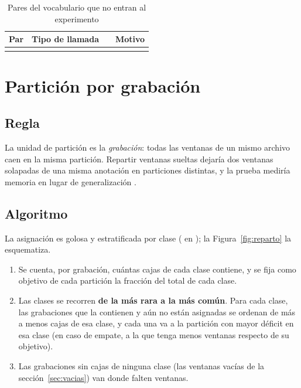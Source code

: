 \documentclass[12pt,a4paper]{article}
\begin{document}
\begin{table}[htbp]
    \centering
    \caption{Pares del vocabulario que no entran al experimento}
    \label{tab:excluidas}
    \small
    \begin{tabular}{@{}lL{4.4cm}rL{4.2cm}@{}}
        \toprule
        \textbf{Par} & \textbf{Tipo de llamada} &  & \textbf{Motivo} \\
        \midrule
         \\
        \bottomrule
    \end{tabular}
\end{table}

\section{Partición por grabación}
\label{sec:particion}

\subsection{Regla}

La unidad de partición es la \emph{grabación}: todas las ventanas de un mismo archivo caen en
la misma partición. Repartir ventanas sueltas dejaría dos ventanas solapadas de una misma
anotación en particiones distintas, y la prueba mediría memoria en lugar de generalización
\citep{koga_lead_2024}.


\subsection{Algoritmo}

La asignación es golosa y estratificada por clase ( en
); la Figura~\ref{fig:reparto} la esquematiza.

\begin{enumerate}
    \item Se cuenta, por grabación, cuántas cajas de cada clase contiene, y se fija como
          objetivo de cada partición la fracción \splitRatios{} del total de cada clase.
    \item Las clases se recorren \textbf{de la más rara a la más común}. Para cada clase, las
          grabaciones que la contienen y aún no están asignadas se ordenan de más a menos cajas
          de esa clase, y cada una va a la partición con mayor déficit en esa clase (en caso de
          empate, a la que tenga menos ventanas respecto de su objetivo).
    \item Las grabaciones sin cajas de ninguna clase (las ventanas vacías de la
          sección~\ref{sec:vacias}) van donde falten ventanas.
\end{enumerate}
\end{document}
